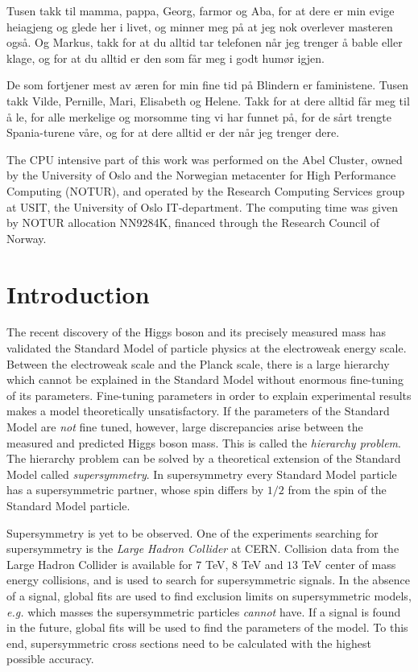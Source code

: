 \documentclass[twoside,english]{uiofysmaster}
\begin{document}
Tusen takk til mamma, pappa, Georg, farmor og Aba, for at dere er min evige heiagjeng og glede her i livet, og minner meg p{\aa} at jeg nok overlever masteren ogs{\aa}. Og Markus, takk for at du alltid tar telefonen n{\aa}r jeg trenger {\aa} bable eller klage, og for at du alltid er den som f{\aa}r meg i godt hum{\o}r igjen.

De som fortjener mest av {\ae}ren for min fine tid p{\aa} Blindern er faministene. Tusen takk Vilde, Pernille, Mari, Elisabeth og Helene. Takk for at dere alltid f{\aa}r meg til {\aa} le, for alle merkelige og morsomme ting vi har funnet p{\aa}, for de s{\aa}rt trengte Spania-turene v{\aa}re, og for at dere alltid er der n{\aa}r jeg trenger dere. 

The CPU intensive part of this work was performed on the Abel Cluster, owned by the University of Oslo and the Norwegian metacenter for High Performance Computing (NOTUR), and operated by the Research Computing Services group at USIT, the University of Oslo IT-department. The computing time was given by NOTUR allocation NN9284K, financed through the Research Council of Norway.




\tableofcontents

\chapter*{Introduction}

The recent discovery of the Higgs boson \cite{Aad:2012tfa, Chatrchyan:2012xdj} and its precisely measured mass has validated the Standard Model of particle physics at the electroweak energy scale. Between the electroweak scale and the Planck scale, there is a large hierarchy which cannot be explained in the Standard Model without enormous fine-tuning of its parameters. Fine-tuning parameters in order to explain experimental results makes a model theoretically unsatisfactory. If the parameters of the Standard Model are \textit{not} fine tuned, however, large discrepancies arise between the measured and predicted Higgs boson mass. This is called the \textit{hierarchy problem}. The hierarchy problem can be solved by a theoretical extension of the Standard Model called \textit{supersymmetry}. In supersymmetry every Standard Model particle has a supersymmetric partner, whose spin differs by $1/2$ from the spin of the Standard Model particle. 

Supersymmetry is yet to be observed. One of the experiments searching for supersymmetry is the \textit{Large Hadron Collider} at CERN. Collision data from the Large Hadron Collider is available for $7$ TeV, $8$ TeV and $13$ TeV center of mass energy collisions, and is used to search for supersymmetric signals. In the absence of a signal, global fits are used to find exclusion limits on supersymmetric models, \textit{e.g.} which masses the supersymmetric particles \textit{cannot} have. If a signal is found in the future, global fits will be used to find the parameters of the model. To this end, supersymmetric cross sections need to be calculated with the highest possible accuracy.
\end{document}
